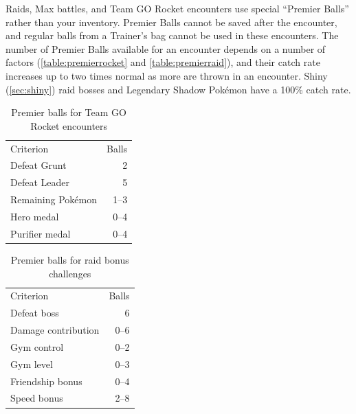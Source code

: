 Raids, Max battles, and Team GO Rocket encounters use special ``Premier Balls''
  rather than your inventory.
Premier Balls cannot be saved after the encounter, and regular balls from
  a Trainer's bag cannot be used in these encounters.
The number of Premier Balls available for an encounter depends on a number of factors (\autoref{table:premierrocket}
  and \autoref{table:premierraid}),
  and their catch rate increases up to two times normal as more are thrown in an encounter.
Shiny (\autoref{sec:shiny}) raid bosses and Legendary Shadow Pokémon have a 100\% catch rate.
\begin{table}
\centering
\begin{tabular}{lr}
Criterion & Balls\\
\Midrule
Defeat Grunt & 2\\
Defeat Leader & 5\\
Remaining Pokémon & 1--3\\
  Hero medal & 0--4\\
  Purifier medal & 0--4\\
\end{tabular}
\caption{Premier balls for Team GO Rocket encounters}
\label{table:premierrocket}
\end{table}
\begin{table}
\centering
\begin{tabular}{lr}
Criterion & Balls\\
\Midrule
  Defeat boss & 6\\
  Damage contribution & 0--6\\
  Gym control & 0--2\\
  Gym level & 0--3\\
  Friendship bonus & 0--4\\
  Speed bonus & 2--8\\
\end{tabular}
\caption{Premier balls for raid bonus challenges}
\label{table:premierraid}
\end{table}

